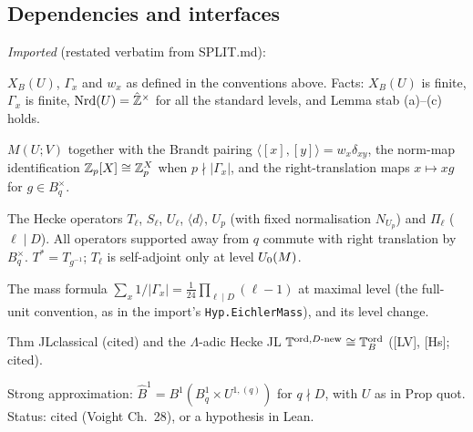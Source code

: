 \subsection{Dependencies and interfaces}
\emph{Imported} (restated verbatim from SPLIT.md):

\begin{interface}
$X_B(U)$, $\Gamma_x$ and $w_x$ as defined in the conventions above. Facts: $X_B(U)$ is finite, $\Gamma_x$ is finite,
$\mathrm{Nrd}(U)=\hat{\mathbb{Z}}^\times$ for all the standard levels, and Lemma stab (a)--(c) holds. 
\end{interface}
\begin{interface}
$M(U;V)$ together with the Brandt pairing $\langle[x],[y]\rangle=w_x\delta_{xy}$, the norm-map identification
$\mathbb{Z}_p[X]\cong\mathbb{Z}_p^X$ when $p\nmid|\Gamma_x|$, and the right-translation maps $x\mapsto xg$ for $g\in B_q^\times$.
\end{interface}
\begin{interface}
The Hecke operators $T_\ell$, $S_\ell$, $U_\ell$, $\langle d\rangle$, $U_p$ (with fixed normalisation $N_{U_p}$) and $\Pi_\ell$
($\ell\mid D$). All operators supported away from $q$ commute with right translation by $B_q^\times$. $T^*=T_{g^{-1}}$; $T_\ell$ is self-adjoint only at level $U_0(M)$.
\end{interface}
\begin{interface}
The mass formula $\sum_x1/|\Gamma_x|=\frac1{24}\prod_{\ell\mid D}(\ell-1)$ at maximal level (the full-unit convention, as in the import's
\texttt{Hyp.EichlerMass}), and its level change. 
\end{interface}
\begin{interface}
Thm JLclassical (cited) and the $\Lambda$-adic Hecke JL $\mathbb{T}^{\mathrm{ord},D\text{-new}}\cong\mathbb{T}^{\mathrm{ord}}_B$ ([LV], [Hs]; cited).
\end{interface}
\begin{interface}[\texttt{if:s02-SA}]
Strong approximation: $\hat B^1=B^1(B^1_q\times U^{1,(q)})$ for $q\nmid D$, with $U$ as in Prop quot. Status: cited (Voight Ch.~28), or a
hypothesis in Lean. 
\end{interface}
